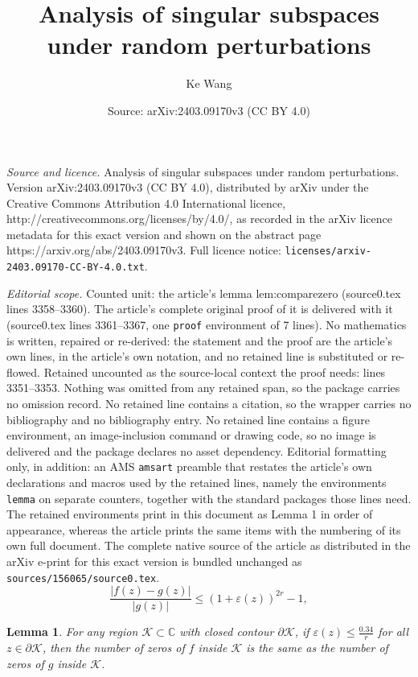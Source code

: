 \documentclass[10pt,a4paper]{amsart}
\title{Analysis of singular subspaces under random perturbations}
\author{Ke Wang}
\date{Source: arXiv:2403.09170v3 (CC BY 4.0)}
\newtheorem{lemma}{Lemma}
\newcommand{\eps}{\varepsilon}
\begin{document}
\maketitle

\noindent\emph{Source and licence.} Analysis of singular subspaces under random perturbations. Version arXiv:2403.09170v3 (CC BY 4.0), distributed by arXiv under the Creative Commons Attribution 4.0 International licence, http://creativecommons.org/licenses/by/4.0/, as recorded in the arXiv licence metadata for this exact version and shown on the abstract page https://arxiv.org/abs/2403.09170v3. Full licence notice: \texttt{licenses/arxiv-2403.09170-CC-BY-4.0.txt}.\par\smallskip

\noindent\textit{Editorial scope.} Counted unit: the article's lemma lem:comparezero (source0.tex lines 3358--3360). The article's complete original proof of it is delivered with it (source0.tex lines 3361--3367, one \texttt{proof} environment of 7 lines). No mathematics is written, repaired or re-derived: the statement and the proof are the article's own lines, in the article's own notation, and no retained line is substituted or re-flowed.  Retained uncounted as the source-local context the proof needs: lines 3351--3353.  Nothing was omitted from any retained span, so the package carries no omission record.  No retained line contains a citation, so the wrapper carries no bibliography and no bibliography entry.  No retained line contains a figure environment, an image-inclusion command or drawing code, so no image is delivered and the package declares no asset dependency.  Editorial formatting only, in addition: an AMS \texttt{amsart} preamble that restates the article's own declarations and macros used by the retained lines, namely the environments \texttt{lemma} on separate counters, together with the standard packages those lines need.  The retained environments print in this document as Lemma 1 in order of appearance, whereas the article prints the same items with the numbering of its own full document.  The complete native source of the article as distributed in the arXiv e-print for this exact version is bundled unchanged as \texttt{sources/156065/source0.tex}.
\begin{equation} \label{eq:rouche}
	\frac{ |f(z) - g(z)|}{|g(z)|} \leq \left( 1 + \varepsilon(z) \right)^{2r} - 1, 
\end{equation} 

\begin{lemma}\label{lem:comparezero}
For any region $\mathcal K\subset \mathbb C$ with closed contour $\partial \mathcal K$, if $\eps(z) \le \frac{0.34}{r}$ for all $z\in \partial \mathcal K$, then the number of zeros of $f$ inside $\mathcal{K}$ is the same as the number of zeros of $g$ inside $\mathcal{K}$.
\end{lemma}
\end{document}
